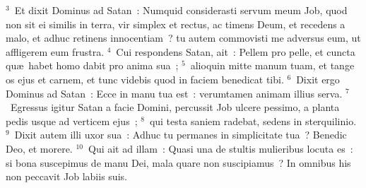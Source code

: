${}^{3}$~Et dixit Dominus ad Satan~: Numquid considerasti servum meum Job, quod non sit ei similis in terra, vir simplex et rectus, ac timens Deum, et recedens a malo, et adhuc retinens innocentiam~? tu autem commovisti me adversus eum, ut affligerem eum frustra.
${}^{4}$~Cui respondens Satan, ait~: Pellem pro pelle, et cuncta qu\ae\ habet homo dabit pro anima sua~;
${}^{5}$~alioquin mitte manum tuam, et tange os ejus et carnem, et tunc videbis quod in faciem benedicat tibi.
${}^{6}$~Dixit ergo Dominus ad Satan~: Ecce in manu tua est~: verumtamen animam illius serva.
${}^{7}$~Egressus igitur Satan a facie Domini, percussit Job ulcere pessimo, a planta pedis usque ad verticem ejus~;
${}^{8}$~qui testa saniem radebat, sedens in sterquilinio.
${}^{9}$~Dixit autem illi uxor sua~: Adhuc tu permanes in simplicitate tua~? Benedic Deo, et morere.
${}^{10}$~Qui ait ad illam~: Quasi una de stultis mulieribus locuta es~: si bona suscepimus de manu Dei, mala quare non suscipiamus~? In omnibus his non peccavit Job labiis suis.


